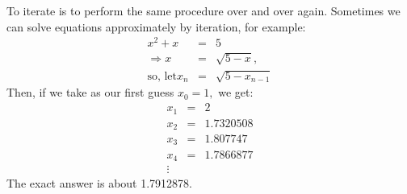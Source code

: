 To iterate is to perform the same procedure over and over again. Sometimes 
we can solve equations approximately by iteration, for example:
\begin{eqnarray*}
  x^2 + x &=& 5 \\
  \Rightarrow x &=& \sqrt{5- x}, \\
  \mbox{so, let} x_{n} &=& \sqrt{5- x_{n-1}}
\end{eqnarray*}
Then, if we take as our first guess $x_{0}=1,$  we get:
\begin{eqnarray*}
x_{1}&=&2\\
x_{2}&=&1.7320508\\
x_{3}&=&1.807747\\
x_{4}&=&1.7866877\\
\vdots
\end{eqnarray*}
The exact answer is about 1.7912878.